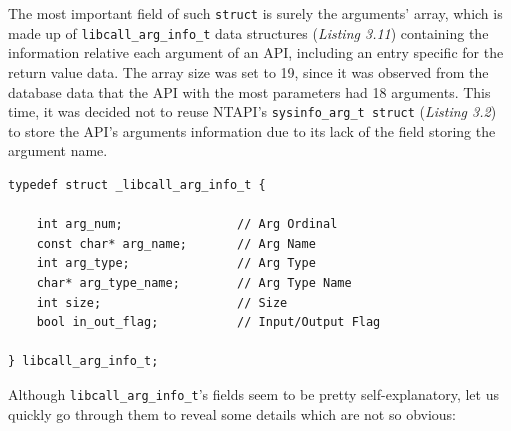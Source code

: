 The most important field of such \texttt{struct} is surely the arguments' array, which is made up of \texttt{libcall\_arg\_info\_t} data structures (\textit{Listing 3.11}) containing the information relative each argument of an API, including an entry specific for the return value data. The array size was set to 19, since it was observed from the database data that the API with the most parameters had 18 arguments. This time, it was decided not to reuse NTAPI's \texttt{sysinfo\_arg\_t struct} (\textit{Listing 3.2}) to store the API's arguments information due to its lack of the field storing the argument name. 
\\
\begin{lstlisting}[caption={\texttt{struct} containing information associated to an API argument},captionpos=b]
typedef struct _libcall_arg_info_t {

	int arg_num;				// Arg Ordinal
	const char* arg_name;		// Arg Name
	int arg_type;             	// Arg Type
	char* arg_type_name;		// Arg Type Name
	int size;					// Size
	bool in_out_flag;			// Input/Output Flag

} libcall_arg_info_t;
\end{lstlisting}   

Although \texttt{libcall\_arg\_info\_t}'s fields seem to be pretty self-explanatory, let us quickly go through them to reveal some details which are not so obvious:

